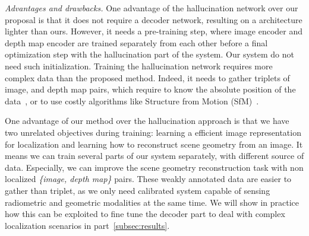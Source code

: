 \vspace{4pt}\noindent\textit{Advantages and drawbacks.}
\label{paragraph:adv}
One advantage of the hallucination network over our proposal is that it does not require a decoder network, resulting on a architecture lighter than ours. However, it needs a pre-training step, where image encoder and depth map encoder are trained separately from each other before a final optimization step with the hallucination part of the system. Our system do not need such initialization. Training the hallucination network requires more complex data than the proposed method. Indeed, it needs to gather triplets of image, and depth map pairs, which require to know the absolute position of the data~\cite{Arandjelovic2017,Liu2018}, or to use costly algorithms like Structure from Motion (SfM)~\cite{Godard2017,Radenovic2017,Kim2017a}. 

One advantage of our method over the hallucination approach is that we have two unrelated objectives during training: learning a efficient image representation for localization and learning how to reconstruct scene geometry from an image. It means we can train several parts of our system separately, with different source of data. Especially, we can improve the scene geometry reconstruction task with non localized \textit{\{image, depth map\}} pairs. These weakly annotated data are easier to gather than triplet, as we only need calibrated system capable of sensing radiometric and geometric modalities at the same time. We will show in practice how this can be exploited to fine tune the decoder part to deal with complex localization scenarios in part~\ref{subsec:results}.
